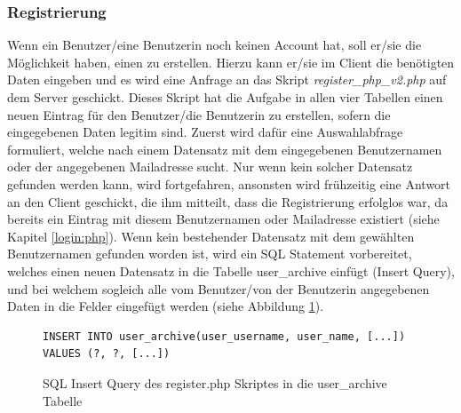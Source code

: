 \documentclass[a4paper,11pt]{report}
\begin{document}
					
					\subsubsection{Registrierung}%
					Wenn ein Benutzer/eine Benutzerin noch keinen Account hat, soll er/sie die Möglichkeit haben, einen zu erstellen. Hierzu kann er/sie im Client die benötigten Daten eingeben und es wird eine Anfrage an das Skript \emph{register\_php\_v2.php} auf dem Server geschickt. Dieses Skript hat die Aufgabe in allen vier Tabellen einen neuen Eintrag für den Benutzer/die Benutzerin zu erstellen, sofern die eingegebenen Daten legitim sind. Zuerst wird dafür eine Auswahlabfrage formuliert, welche nach einem Datensatz mit dem eingegebenen Benutzernamen oder der angegebenen Mailadresse sucht. Nur wenn kein solcher Datensatz gefunden werden kann, wird fortgefahren, ansonsten wird frühzeitig eine Antwort an den Client geschickt, die ihm mitteilt, dass die Registrierung erfolglos war, da bereits ein Eintrag mit diesem Benutzernamen oder Mailadresse existiert (siehe Kapitel \ref{login:php}). Wenn kein bestehender Datensatz mit dem gewählten Benutzernamen gefunden worden ist, wird ein SQL Statement vorbereitet, welches einen neuen Datensatz in die Tabelle user\_archive einfügt (Insert Query), und bei welchem sogleich alle vom Benutzer/von der Benutzerin angegebenen Daten in die Felder eingefügt werden (siehe Abbildung \ref{SQL:INSERT}).
				\begin{figure} 
					\begin{center}
					\begin{verbatim}
INSERT INTO user_archive(user_username, user_name, [...]) VALUES (?, ?, [...])
					\end{verbatim}
					\caption{SQL Insert Query des register.php Skriptes in die user\_archive Tabelle}
					\label{SQL:INSERT}
				\end{center}
				\end{figure}
			
\end{document}
